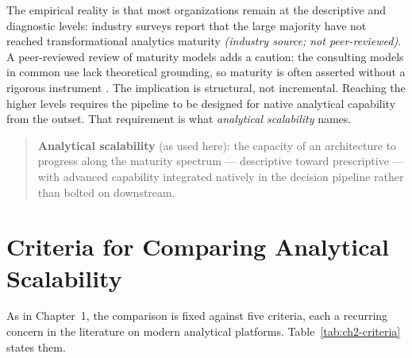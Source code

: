 The empirical reality is that most organizations remain at the descriptive and diagnostic levels: industry surveys report that the large majority have not reached transformational analytics maturity \parencite{gartner2018maturity} \textit{(industry source; not peer-reviewed)}. A peer-reviewed review of maturity models adds a caution: the consulting models in common use lack theoretical grounding, so maturity is often asserted without a rigorous instrument \parencite{dataanalyticsmaturity2024}. The implication is structural, not incremental. Reaching the higher levels requires the pipeline to be designed for native analytical capability from the outset. That requirement is what \textit{analytical scalability} names.

\begin{quote}
\textbf{Analytical scalability} (as used here): the capacity of an architecture to progress along the maturity spectrum --- descriptive toward prescriptive --- with advanced capability integrated natively in the decision pipeline rather than bolted on downstream.
\end{quote}

\section{Criteria for Comparing Analytical Scalability}
\label{sec:ch2-criteria}

As in Chapter~1, the comparison is fixed against five criteria, each a recurring concern in the literature on modern analytical platforms. Table~\ref{tab:ch2-criteria} states them.

